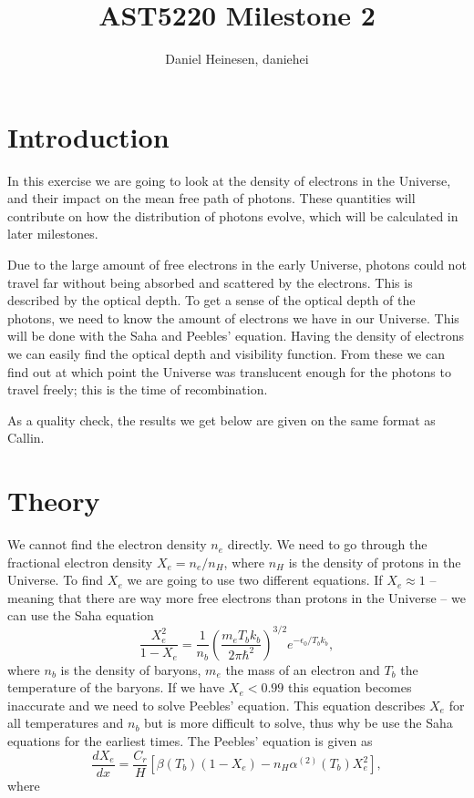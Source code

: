 \documentclass[a4paper,norsk, 10pt]{article}
\title{AST5220 Milestone 2}
\author{Daniel Heinesen, daniehei}
\begin{document}
\maketitle
\section{Introduction}
In this exercise we are going to look at the density of electrons in the Universe, and their impact on the mean free path of photons. These quantities will contribute on how the distribution of photons evolve, which will be calculated in later milestones.

Due to the large amount of free electrons in the early Universe, photons could not travel far without being absorbed and scattered by the electrons. This is described by the optical depth. To get a sense of the optical depth of the photons, we need to know the amount of electrons we have in our Universe. This will be done with the Saha and Peebles' equation. Having the density of electrons we can easily find the optical depth and visibility function. From these we can find out at which point the Universe was translucent enough for the photons to travel freely; this is the time of recombination.

As a quality check, the results we get below are given on the same format as Callin\cite{callin}.

\section{Theory}
We cannot find the electron density $n_e$ directly. We need to go through the fractional electron density $X_e = n_e/n_H$, where $n_H$ is the density of protons in the Universe. To find $X_e$ we are going to use two different equations. If $X_e \approx 1$ -- meaning that there are way more free electrons than protons in the Universe -- we can use the Saha equation
\begin{equation}\label{eq:saha}
\frac{X_e^2}{1-X_e} = \frac{1}{n_b}\left(\frac{m_e T_b k_b}{2\pi \hbar^2}\right)^{3/2} e^{-\epsilon_0/T_b k_b},
\end{equation}
where $n_b$ is the density of baryons, $m_e$ the mass of an electron and $T_b$ the temperature of the baryons. If we have $X_e < 0.99$ this equation becomes inaccurate and we need to solve Peebles' equation. This equation describes $X_e$ for all temperatures and $n_b$ but is more difficult to solve, thus why be use the Saha equations for the earliest times. The Peebles' equation is given as
\begin{equation}\label{eq:peebles}
\frac{dX_e}{dx} = \frac{C_r}{H}\left[\beta (T_b)(1-X_e) - n_H \alpha^{(2)}(T_b)X_e^2 \right],
\end{equation}
where
\end{document}
